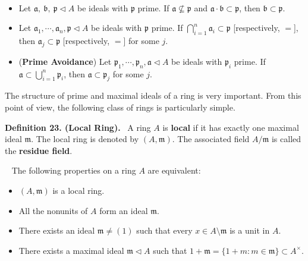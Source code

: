 \documentclass[12pt,a4paper,footinclude=true,headinclude=true]{scrbook} %
\newenvironment{proposition}[2][]
{\renewcommand\theinnercustomprop{#2}\innercustomprop[#1] 
\begin{mdframed}[backgroundcolor=gray!20]\ }
{\end{mdframed}\endinnercustomprop}
\newenvironment{lemma}[2][]
{\renewcommand\theinnercustomlemma{#2}\innercustomlemma[#1]
\begin{mdframed}[backgroundcolor=gray!20]\ }
{\end{mdframed}\endinnercustomprop}
\newenvironment{definition}[2][Definition]
    { \begin{mdframed}[backgroundcolor=gray!20] \textbf{#1 #2.}\ }
    {  \end{mdframed}}
\begin{document}
\begin{lemma}{22}
    \begin{itemize}
        \item[(a)] Let $\mathfrak{a},\ \mathfrak{b},\ \mathfrak{p}\triangleleft A$ be ideals with $\mathfrak{p}$ prime. If $\mathfrak{a}\nsubseteq\mathfrak{p}$ and $\mathfrak{a}\cdot \mathfrak{b}\subset\mathfrak{p}$, then $\mathfrak{b}\subset\mathfrak{p}$. 
        \item[(b)] Let $\mathfrak{a}_1,\cdots,\mathfrak{a}_n,\mathfrak{p}\triangleleft A$ be ideals with $\mathfrak{p}$ prime. If $\bigcap_{i=1}^n\mathfrak{a}_i\subset\mathfrak{p}$ [respectively, $=$], then $\mathfrak{a}_j\subset\mathfrak{p}$ [respectively, $=$] for some $j$.
        \item[(c)] (\textbf{Prime Avoidance}) Let $\mathfrak{p}_1,\cdots,\mathfrak{p}_n,\mathfrak{a}\triangleleft A$ be ideals with $\mathfrak{p}_i$ prime. If $\mathfrak{a}\subset\bigcup_{i=1}^n\mathfrak{p}_i$, then $\mathfrak{a}\subset\mathfrak{p}_j$ for some $j$.
    \end{itemize}
\end{lemma}

The structure of prime and maximal ideals of a ring is very important. From this point of view, the following class of rings is particularly simple.
\begin{definition}{23. (Local Ring)}
    A ring $A$ is \textbf{local} if it has exactly one maximal ideal $\mathfrak{m}$. The local ring is denoted by $(A,\mathfrak{m})$. The associated field $A/\mathfrak{m}$ is called the \textbf{residue field}.
\end{definition}

\begin{proposition}{24}
    The following properties on a ring $A$ are equivalent:
    \begin{itemize}
        \item[(a)] $(A,\mathfrak{m})$ is a local ring.
        \item[(b)] All the nonunits of $A$ form an ideal $\mathfrak{m}$.
        \item[(c)] There exists an ideal $\mathfrak{m}\neq(1)$ such that every $x\in A\setminus\mathfrak{m}$ is a unit in $A$.
        \item[(d)] There exists a maximal ideal $\mathfrak{m} \triangleleft A$ such that $1+\mathfrak{m}=\{1+m:m\in\mathfrak{m}\}\subset A^{\times}$.
    \end{itemize}
\end{proposition}
\end{document}
